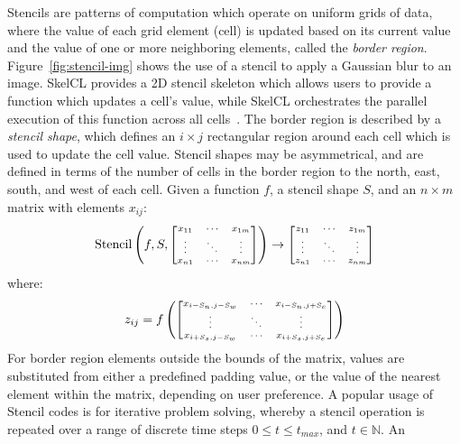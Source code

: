 Stencils are patterns of computation which operate on uniform grids of
data, where the value of each grid element (cell) is updated based on
its current value and the value of one or more neighboring elements,
called the \emph{border region}. Figure~\ref{fig:stencil-img} shows
the use of a stencil to apply a Gaussian blur to an image. SkelCL
provides a 2D stencil skeleton which allows users to provide a
function which updates a cell's value, while SkelCL orchestrates the
parallel execution of this function across all
cells~\cite{Steuwer2014a}. The border region is described by a
\emph{stencil shape}, which defines an $i \times j$ rectangular region
around each cell which is used to update the cell value. Stencil
shapes may be asymmetrical, and are defined in terms of the number of
cells in the border region to the north, east, south, and west of each
cell. Given a function $f$, a stencil shape $S$, and an $n \times m$
matrix with elements $x_{ij}$:
%
\begin{equation}
\scriptsize
\stencil \left( f, S,
\begin{bmatrix}
  x_{11} & \cdots & x_{1m} \\
  \vdots & \ddots & \vdots \\
  x_{n1} & \cdots & x_{nm}
\end{bmatrix} \right)
\to
\begin{bmatrix}
  z_{11} & \cdots & z_{1m} \\
  \vdots & \ddots & \vdots \\
  z_{n1} & \cdots & z_{nm}
\end{bmatrix}
\end{equation}
%
where:
%
\begin{equation}
\scriptsize
z_{ij} = f \left(
\begin{bmatrix}
  x_{i-S_n,j-S_w} & \cdots & x_{i-S_n,j+S_e} \\
  \vdots & \ddots & \vdots \\
  x_{i+S_s,j-S_w} & \cdots & x_{i+S_s,j+S_e}
\end{bmatrix} \right)
\end{equation}
%
For border region elements outside the bounds of the matrix, values
are substituted from either a predefined padding value, or the value
of the nearest element within the matrix, depending on user
preference. A popular usage of Stencil codes is for iterative problem
solving, whereby a stencil operation is repeated over a range of
discrete time steps $0 \le t \le t_{max}$, and $t \in \mathbb{N}$. An
